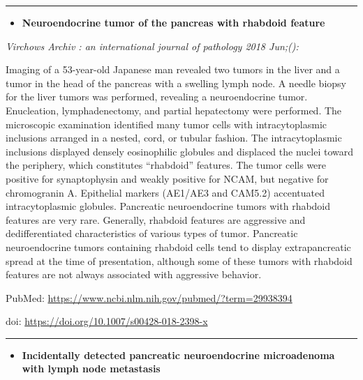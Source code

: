 \documentclass[]{article}
\providecommand{\tightlist}{%
  \setlength{\itemsep}{0pt}\setlength{\parskip}{0pt}}
\begin{document}
{}

{}

\begin{center}\rule{0.5\linewidth}{\linethickness}\end{center}

\begin{itemize}
\tightlist
\item
  \textbf{Neuroendocrine tumor of the pancreas with rhabdoid feature}
\end{itemize}

\emph{Virchows Archiv : an international journal of pathology 2018
Jun;():}

Imaging of a 53-year-old Japanese man revealed two tumors in the liver
and a tumor in the head of the pancreas with a swelling lymph node. A
needle biopsy for the liver tumors was performed, revealing a
neuroendocrine tumor. Enucleation, lymphadenectomy, and partial
hepatectomy were performed. The microscopic examination identified many
tumor cells with intracytoplasmic inclusions arranged in a nested, cord,
or tubular fashion. The intracytoplasmic inclusions displayed densely
eosinophilic globules and displaced the nuclei toward the periphery,
which constitutes ``rhabdoid'' features. The tumor cells were positive
for synaptophysin and weakly positive for NCAM, but negative for
chromogranin A. Epithelial markers (AE1/AE3 and CAM5.2) accentuated
intracytoplasmic globules. Pancreatic neuroendocrine tumors with
rhabdoid features are very rare. Generally, rhabdoid features are
aggressive and dedifferentiated characteristics of various types of
tumor. Pancreatic neuroendocrine tumors containing rhabdoid cells tend
to display extrapancreatic spread at the time of presentation, although
some of these tumors with rhabdoid features are not always associated
with aggressive behavior.

PubMed: \url{https://www.ncbi.nlm.nih.gov/pubmed/?term=29938394}

doi: \url{https://doi.org/10.1007/s00428-018-2398-x}

{}

{}

\begin{center}\rule{0.5\linewidth}{\linethickness}\end{center}

\begin{itemize}
\tightlist
\item
  \textbf{Incidentally detected pancreatic neuroendocrine microadenoma
  with lymph node metastasis}
\end{itemize}
\end{document}
